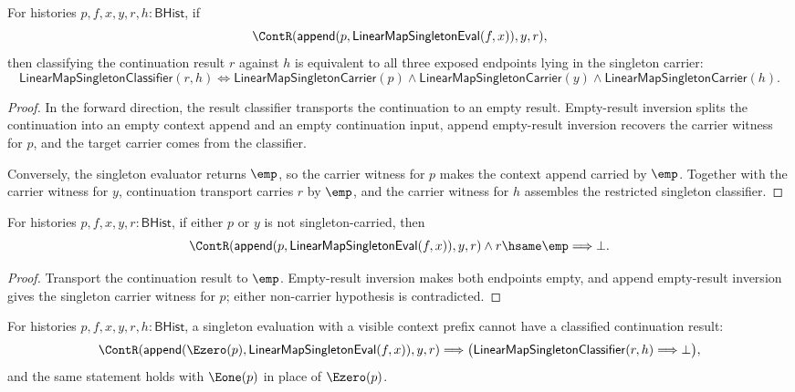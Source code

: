 \begin{theorem}
\label{thm:linearmap-singleton-eval-context-continuation-classifier}
For histories $p,f,x,y,r,h:\mathsf{BHist}$, if
$$
\ContR(\mathsf{append}(p,\mathsf{LinearMapSingletonEval}(f,x)),y,r),
$$
then classifying the continuation result $r$ against $h$ is equivalent to all
three exposed endpoints lying in the singleton carrier:
$$
\mathsf{LinearMapSingletonClassifier}(r,h)
\Longleftrightarrow
\mathsf{LinearMapSingletonCarrier}(p)\land
\mathsf{LinearMapSingletonCarrier}(y)\land
\mathsf{LinearMapSingletonCarrier}(h).
$$
\end{theorem}
\begin{proof}
In the forward direction, the result classifier transports the continuation to an empty result. Empty-result inversion splits the continuation into an empty context append and an empty continuation input, append empty-result inversion recovers the carrier witness for $p$, and the target carrier comes from the classifier.

Conversely, the singleton evaluator returns $\emp$, so the carrier witness for $p$ makes the context append carried by $\emp$. Together with the carrier witness for $y$, continuation transport carries $r$ by $\emp$, and the carrier witness for $h$ assembles the restricted singleton classifier.
\end{proof}
\begin{theorem}
\label{thm:linearmap-singleton-eval-context-nonempty-endpoint-continuation-result-absurd}
For histories $p,f,x,y,r:\mathsf{BHist}$, if either $p$ or $y$ is not singleton-carried, then
$$
\ContR(\mathsf{append}(p,\mathsf{LinearMapSingletonEval}(f,x)),y,r)\land r\hsame\emp\Longrightarrow\bot.
$$
\end{theorem}
\begin{proof}
Transport the continuation result to $\emp$. Empty-result inversion makes both endpoints empty, and append empty-result inversion gives the singleton carrier witness for $p$; either non-carrier hypothesis is contradicted.
\end{proof}
\begin{theorem}
\label{thm:linearmap-singleton-eval-context-continuation-visible-context-absurd}
For histories $p,f,x,y,r,h:\mathsf{BHist}$, a singleton evaluation with a
visible context prefix cannot have a classified continuation result:
$$
\ContR(\mathsf{append}(\Ezero(p),\mathsf{LinearMapSingletonEval}(f,x)),y,r)
\Longrightarrow
\bigl(\mathsf{LinearMapSingletonClassifier}(r,h)\Longrightarrow\bot\bigr),
$$
and the same statement holds with $\Eone(p)$ in place of $\Ezero(p)$.
\end{theorem}
